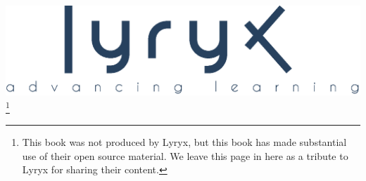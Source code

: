 \setlength{\parskip}{0pt}
\thispagestyle{empty}


\vspace{-3em}
\begin{center}
	\includegraphics[width=.4\textwidth]{figures/LyryxLogo.eps}\footnote{This book was not produced by Lyryx, but this book has made substantial use of their open source material.  We leave this page in here as a tribute to Lyryx for sharing their content.}

	\vspace{2em}
	\textcolor{lscstextcolour}{\textbf{\fontsize{24}{28}\selectfont {Champions of Access to Knowledge}}}
\end{center}

\vfill

